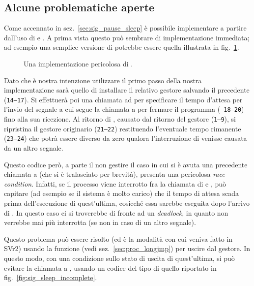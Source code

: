 \subsection{Alcune problematiche aperte}
\label{sec:sig_example}

Come accennato in sez.~\ref{sec:sig_pause_sleep} è possibile implementare
 a partire dall'uso di  e . A prima vista
questo può sembrare di implementazione immediata; ad esempio una semplice
versione di  potrebbe essere quella illustrata in
fig.~\ref{fig:sig_sleep_wrong}.

\begin{figure}[!htb]
  \footnotesize \centering
  \begin{minipage}[c]{\codesamplewidth}
  \end{minipage}
  \normalsize 
  \caption{Una implementazione pericolosa di .} 
  \label{fig:sig_sleep_wrong}
\end{figure}

Dato che è nostra intenzione utilizzare  il primo passo della
nostra implementazione sarà quello di installare il relativo gestore salvando
il precedente (\texttt{\small 14--17}).  Si effettuerà poi una chiamata ad
 per specificare il tempo d'attesa per l'invio del segnale a cui
segue la chiamata a  per fermare il programma (\texttt{\small
  18--20}) fino alla sua ricezione.  Al ritorno di , causato dal
ritorno del gestore (\texttt{\small 1--9}), si ripristina il gestore originario
(\texttt{\small 21--22}) restituendo l'eventuale tempo rimanente
(\texttt{\small 23--24}) che potrà essere diverso da zero qualora
l'interruzione di  venisse causata da un altro segnale.

Questo codice però, a parte il non gestire il caso in cui si è avuta una
precedente chiamata a  (che si è tralasciato per brevità),
presenta una pericolosa \textit{race condition}.  Infatti, se il processo
viene interrotto fra la chiamata di  e , può capitare
(ad esempio se il sistema è molto carico) che il tempo di attesa scada prima
dell'esecuzione di quest'ultima, cosicché essa sarebbe eseguita dopo l'arrivo
di . In questo caso ci si troverebbe di fronte ad un
\textit{deadlock}, in quanto  non verrebbe mai più interrotta (se
non in caso di un altro segnale).

Questo problema può essere risolto (ed è la modalità con cui veniva fatto in
SVr2) usando la funzione  (vedi sez.~\ref{sec:proc_longjmp}) per
uscire dal gestore. In questo modo, con una condizione sullo stato di
uscita di quest'ultima, si può evitare la chiamata a , usando un
codice del tipo di quello riportato in fig.~\ref{fig:sig_sleep_incomplete}.

